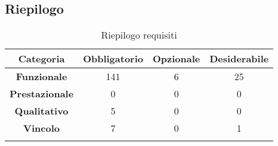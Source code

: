 \subsection{Riepilogo}
\label{riepilogo}
\begin{center}
\begin{longtable}{|c|c|c|c|}
\hline
\textbf{Categoria} & \textbf{Obbligatorio} & \textbf{Opzionale} & \textbf{Desiderabile} \\
\hline
\textbf{Funzionale} &141 & 6 & 25 \\ 
\hline
\textbf{Prestazionale} & 0 & 0 & 0 \\
\hline
\textbf{Qualitativo} & 5 & 0 & 0 \\
\hline
\textbf{Vincolo} & 7 & 0 & 1 \\
\hline
\caption{Riepilogo requisiti}
\end{longtable}
\end{center}